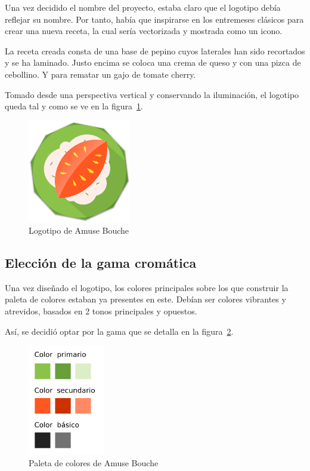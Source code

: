 Una vez decidido el nombre del proyecto, estaba claro que el logotipo debía
reflejar su nombre. Por tanto, había que inspirarse en los entremeses clásicos
para crear una nueva receta, la cual sería vectorizada y mostrada como un icono.

La receta creada consta de una base de pepino cuyos laterales han sido
recortados y se ha laminado. Justo encima se coloca una crema de queso y
con una pizca de cebollino. Y para rematar un gajo de tomate cherry.

Tomado desde una perspectiva vertical y conservando la iluminación, el logotipo
queda tal y como se ve en la figura~\ref{fig:logotipo}.

\begin{figure}[htbp]
  \centering
  \includegraphics[width=0.4\textwidth]{cap5/img/logotipo}
  \caption{Logotipo de Amuse Bouche}
  \label{fig:logotipo}
\end{figure}


\subsection{Elección de la gama cromática}

Una vez diseñado el logotipo, los colores principales sobre los que construir
la paleta de colores estaban ya presentes en este. Debían ser colores vibrantes
y atrevidos, basados en 2 tonos principales y opuestos.

Así, se decidió optar por la gama que se detalla en la
figura~\ref{fig:paleta-colores}.

\begin{figure}[htbp]
  \centering
  \includegraphics[width=0.3\textwidth]{cap5/img/paleta_colores}
  \caption{Paleta de colores de Amuse Bouche}
  \label{fig:paleta-colores}
\end{figure}


